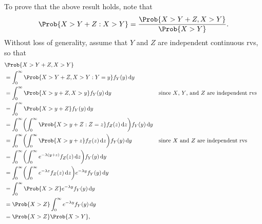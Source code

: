 \begin{enumerate}[(1)]
          To prove that the above result holds, note that
          \[ \Prob{X>Y+Z\given X>Y}=\frac{\Prob{X>Y+Z,X>Y}}{\Prob{X>Y}}. \]
          Without loss of generality, assume that $Y$ and $Z$ are independent continuous rvs, so that
          \begin{align*}
               & \Prob{X>Y+Z,X>Y}                                                                                                                                                  \\
               & =\int_{0}^{\infty}\Prob{X>Y+Z,X>Y\given Y=y}f_Y(y)\odif{y}                                                                                                        \\
               & =\int_{0}^{\infty}\Prob{X>y+Z,X>y}f_Y(y)\odif{y}                                                          &  & \text{since $X$, $Y$, and $Z$ are independent rvs} \\
               & =\int_{0}^{\infty}\Prob{X>y+Z}f_Y(y)\odif{y}                                                                                                                      \\
               & =\int_{0}^{\infty}\biggl(\int_{0}^{\infty}\Prob{X>y+Z\given Z=z}f_Z(z)\odif{z}\biggr)f_Y(y)\odif{y}                                                               \\
               & =\int_{0}^{\infty}\biggl(\int_{0}^{\infty}\Prob{X>y+z}f_Z(z)\odif{z}\biggr)f_Y(y)\odif{y}                 &  & \text{since $X$ and $Z$ are independent rvs}       \\
               & =\int_{0}^{\infty}\biggl(\int_{0}^{\infty}e^{-\lambda(y+z)}f_Z(z)\odif{z}\biggr)f_Y(y)\odif{y}                                                                    \\
               & =\int_{0}^{\infty}\biggl(\int_{0}^{\infty}e^{-\lambda z}f_Z(z)\odif{z}\biggr)e^{-\lambda y}f_Y(y)\odif{y}                                                         \\
               & =\int_{0}^{\infty}\Prob{X>Z}e^{-\lambda y}f_Y(y)\odif{y}                                                                                                          \\
               & =\Prob{X>Z}\int_{0}^{\infty}e^{-\lambda y}f_Y(y)\odif{y}                                                                                                          \\
               & =\Prob{X>Z}\Prob{X>Y},
          \end{align*}

\end{enumerate}
